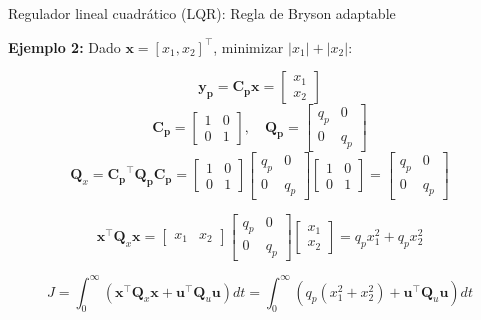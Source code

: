 \documentclass{beamer}
\begin{document}
\begin{frame}{Regulador lineal cuadrático (LQR): Regla de Bryson adaptable}

\textbf{Ejemplo 2:} Dado $\mathbf{x} = [x_1, x_2]^\intercal$, minimizar \(|x_1| + |x_2|\):

\[
\mathbf{y_p} = \mathbf{C_p} \mathbf{x} = \begin{bmatrix}
        x_1 \\ x_2
    \end{bmatrix}
\]
\[
\mathbf{C_p} = \begin{bmatrix}
        1 & 0 \\
        0 & 1
    \end{bmatrix}, \quad
\mathbf{Q_p} = \begin{bmatrix}
        q_p & 0 \\
        0 & q_p
    \end{bmatrix}
\]
\[
\mathbf{Q}_x = \mathbf{C_p}^\intercal \mathbf{Q_p} \mathbf{C_p} = \begin{bmatrix}
        1 & 0 \\
        0 & 1
    \end{bmatrix}
    \begin{bmatrix}
        q_p & 0 \\
        0 & q_p
    \end{bmatrix}
    \begin{bmatrix}
        1 & 0 \\
        0 & 1
    \end{bmatrix} = \begin{bmatrix}
        q_p & 0 \\
        0 & q_p
    \end{bmatrix}
\]

\[
\mathbf{x}^\intercal \mathbf{Q}_x \mathbf{x} = \begin{bmatrix}
        x_1 & x_2
    \end{bmatrix}
    \begin{bmatrix}
        q_p & 0 \\
        0 & q_p
    \end{bmatrix}
    \begin{bmatrix}
        x_1 \\ x_2
    \end{bmatrix}
= q_p x_1^2 + q_p x_2^2
\]

\[
J = \int_0^\infty \left( \mathbf{x}^\intercal \mathbf{Q}_x \mathbf{x} + \mathbf{u}^\intercal \mathbf{Q}_u \mathbf{u} \right) dt = \int_0^\infty \left( q_p (x_1^2 + x_2^2) + \mathbf{u}^\intercal \mathbf{Q}_u \mathbf{u} \right) dt
\]

\end{frame}
\end{document}
